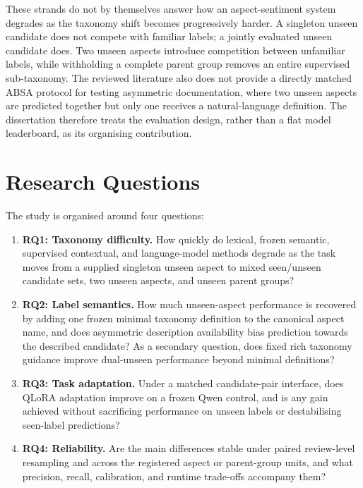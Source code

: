 These strands do not by themselves answer how an aspect-sentiment system
degrades as the taxonomy shift becomes progressively harder. A singleton unseen
candidate does not compete with familiar labels; a jointly evaluated unseen
candidate does. Two unseen aspects introduce competition between unfamiliar
labels, while withholding a complete parent group removes an entire supervised
sub-taxonomy. The reviewed literature also does not provide a directly matched
ABSA protocol for testing asymmetric documentation, where two unseen aspects
are predicted together but only one receives a natural-language definition.
The dissertation therefore treats the evaluation design, rather than a flat
model leaderboard, as its organising contribution.

\section{Research Questions}

The study is organised around four questions:

\begin{enumerate}
    \item \textbf{RQ1: Taxonomy difficulty.} How quickly do lexical, frozen
    semantic, supervised contextual, and language-model methods degrade as the
    task moves from a supplied singleton unseen aspect to mixed seen/unseen
    candidate sets, two unseen aspects, and unseen parent groups?

    \item \textbf{RQ2: Label semantics.} How much unseen-aspect performance is
    recovered by adding one frozen minimal taxonomy definition to the canonical
    aspect name, and does asymmetric description availability bias prediction
    towards the described candidate? As a secondary question, does fixed rich
    taxonomy guidance improve dual-unseen performance beyond minimal
    definitions?

    \item \textbf{RQ3: Task adaptation.} Under a matched candidate-pair
    interface, does QLoRA adaptation improve on a frozen Qwen control, and is
    any gain achieved without sacrificing performance on unseen labels or
    destabilising seen-label predictions?

    \item \textbf{RQ4: Reliability.} Are the main differences stable under
    paired review-level resampling and across the registered aspect or
    parent-group units, and what precision, recall, calibration, and runtime
    trade-offs accompany them?
\end{enumerate}

